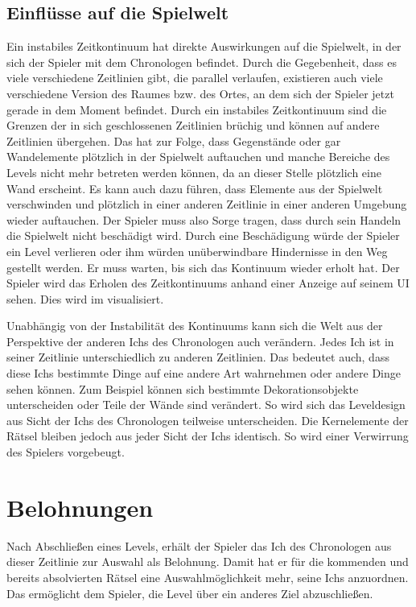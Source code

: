 \subsection{Einflüsse auf die Spielwelt}\label{sec:paradoxon-stability}
Ein instabiles Zeitkontinuum hat direkte Auswirkungen auf die Spielwelt, in der sich der Spieler mit dem Chronologen befindet. Durch die Gegebenheit, dass es viele verschiedene Zeitlinien gibt, die parallel verlaufen, existieren auch viele verschiedene Version des Raumes bzw. des Ortes, an dem sich der Spieler jetzt gerade in dem Moment befindet. Durch ein instabiles Zeitkontinuum sind die Grenzen der in sich geschlossenen Zeitlinien brüchig und können auf andere Zeitlinien übergehen. Das hat zur Folge, dass Gegenstände oder gar Wandelemente plötzlich in der Spielwelt auftauchen und manche Bereiche des Levels nicht mehr betreten werden können, da an dieser Stelle plötzlich eine Wand erscheint. Es kann auch dazu führen, dass Elemente aus der Spielwelt verschwinden und plötzlich in einer anderen Zeitlinie in einer anderen Umgebung wieder auftauchen. Der Spieler muss also Sorge tragen, dass durch sein Handeln die Spielwelt nicht beschädigt wird. Durch eine Beschädigung würde der Spieler ein Level verlieren oder ihm würden unüberwindbare Hindernisse in den Weg gestellt werden. Er muss warten, bis sich das Kontinuum wieder erholt hat. Der Spieler wird das Erholen des Zeitkontinuums anhand einer Anzeige auf seinem \ac{UI} sehen. Dies wird im  visualisiert.

Unabhängig von der Instabilität des Kontinuums kann sich die Welt aus der Perspektive der anderen Ichs des Chronologen auch verändern. Jedes Ich ist in seiner Zeitlinie unterschiedlich zu anderen Zeitlinien. Das bedeutet auch, dass diese Ichs bestimmte Dinge auf eine andere Art wahrnehmen oder andere Dinge sehen können. Zum Beispiel können sich bestimmte Dekorationsobjekte unterscheiden oder Teile der Wände sind verändert. So wird sich das Leveldesign aus Sicht der Ichs des Chronologen teilweise unterscheiden. Die Kernelemente der Rätsel bleiben jedoch aus jeder Sicht der Ichs identisch. So wird einer Verwirrung des Spielers vorgebeugt.

\section{Belohnungen}\label{sec:rewards}
Nach Abschließen eines Levels, erhält der Spieler das Ich des Chronologen aus dieser Zeitlinie zur Auswahl als Belohnung. Damit hat er für die kommenden und bereits absolvierten Rätsel eine Auswahlmöglichkeit mehr, seine Ichs anzuordnen. Das ermöglicht dem Spieler, die Level über ein anderes Ziel abzuschließen.

